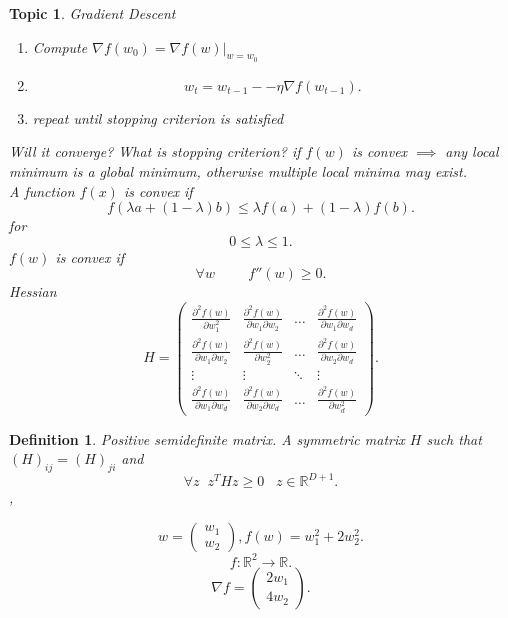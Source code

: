 \documentclass[a4paper,12pt]{scrartcl} %
\theoremstyle{darktheorem}
\newtheorem{topic}[theorem]{Topic}
\newtheorem{definition}[theorem]{Definition}
\begin{document}
\begin{topic}
    Gradient Descent\\
    \begin{enumerate}
        \item Compute $\nabla f(w_0) = \nabla f(w) |_{w = w_0}$
        \item 
            \[
                w_t = w_{t-1} -- \eta \nabla f(w_{t-1})
            .\] 
        \item repeat until stopping criterion is satisfied
    \end{enumerate}
    Will it converge? What is stopping criterion?
    if $f(w)$ is convex $\implies$ any local minimum is a global minimum, otherwise multiple local minima may exist.\\
    A function $f(x)$ is convex if
    \[
    f(\lambda a + (1-\lambda) b) \le \lambda f(a) + (1-\lambda) f(b)
    .\] 
    for
    \[
    0 \le \lambda \le 1
    .\] 
    $f(w)$ is convex if 
    \[
        \forall w \hspace{1cm} f''(w) \ge 0
    .\] 
    Hessian
    \[
        H = \begin{pmatrix} \frac{\partial^2f(w)}{\partial w_1^2} & \frac{\partial^2f(w)}{\partial w_1 \partial w_2} & \dots & \frac{\partial^2 f(w)}{\partial w_1 \partial w_d} \\
            \frac{\partial^2f(w)}{\partial w_1 \partial w_2} & \frac{\partial^2f(w)}{\partial w_2^2} & \dots & \frac{\partial ^2f(w)}{\partial w_2 \partial w_d}\\
            \vdots & \vdots & \ddots & \vdots\\
            \frac{\partial^2f(w)}{\partial w_1 \partial w_d} & \frac{\partial^2f(w)}{\partial w_2 \partial w_d} & \dots & \frac{\partial^2f(w)}{\partial w_d^2}
        \end{pmatrix} 
    .\] 

    
\end{topic}
\begin{definition}
    Positive semidefinite matrix. A symmetric matrix $H$ such that  $(H)_{ij} = (H)_{ji}$ and
     \[
    \forall z \;\; z^{T}Hz \ge 0 \;\;\; z \in \mathbb{R}^{D+1}
    .\] ,
\end{definition}
\[
w = \begin{pmatrix}  w_1 \\ w_2 \end{pmatrix} , f(w) = w_1^2 + 2w_2^2
.\] 
\[
f : \mathbb{R}^2 \rightarrow \mathbb{R}
.\] 
\[
\nabla f = \begin{pmatrix} 2w_1 \\ 4w_2 \end{pmatrix} 
.\] 
\end{document}
